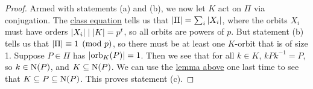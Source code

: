 \begin{proof}
    Armed with statements (a) and (b),
    we now let \(K\) act on \(\Pi\) via conjugation.
    The \hyperref[thm:class-equation]{class equation} tells us that
    \(\abs{\Pi} = \sum_i \abs{X_i}\),
    where the orbits \(X_i\)
    must have orders \(\abs{X_i} \mid \abs{K} = p^t\),
    so all orbits are powers of \(p\).
    But statement (b) tells us that \(\abs{\Pi} \equiv 1 \pmod{p}\),
    so there must be at least one \(K\)-orbit that is of size 1.
    Suppose \(P \in \Pi\) has \(\abs{\operatorname{orb}_K(P)} = 1\).
    Then we see that for all \(k \in K\), \(kPk^{-1} = P\),
    so \(k \in \operatorname{N}(P)\), and \(K \subseteq \operatorname{N}(P)\).
    We can use the \hyperref[lem:prime-power-sylow-subgroup]{lemma above}
    one last time
    to see that \(K \subseteq P \subseteq \operatorname{N}(P)\).
    This proves statement (c).
\end{proof}
